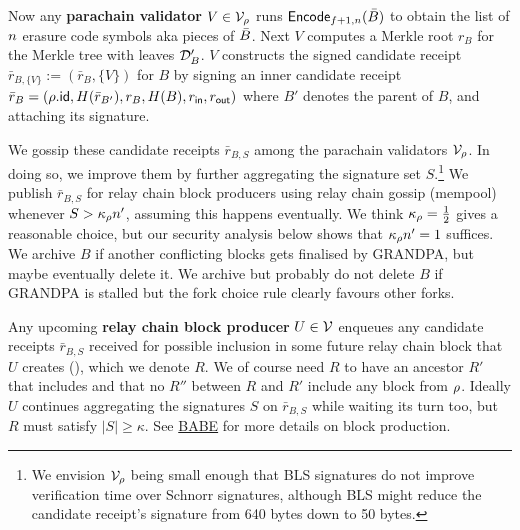 Now any {\bf parachain validator} $V \in \mathcal{V}_{\rho}$ runs $\mathsf{Encode}_{f+1,n}(\bar{B})$ to obtain the list  of $n$ erasure code symbols aka pieces of $\bar{B}$.  Next $V$ computes a Merkle root $r_B$ for the Merkle tree with leaves $\mathcal{D}'_B$.  $V$ constructs the signed candidate receipt $\bar{r}_{B,\{V\}} := (\bar{r}_{B},\{V\})$ for $B$ by signing an inner candidate receipt $\bar{r}_B = (\rho.\mathsf{id},H(\bar{r}_{B'}),r_B,H(B),r_{\mathsf{in}},r_{\mathsf{out}})$ where $B'$ denotes the parent of $B$, and attaching its signature.  

We gossip these candidate receipts $\bar{r}_{B,S}$ among the parachain validators $\mathcal{V}_{\rho}$.  In doing so, we improve them by further aggregating the signature set $S$.\footnote{We envision $\mathcal{V}_{\rho}$ being small enough that BLS signatures do not improve verification time over Schnorr signatures, although BLS might reduce the candidate receipt's signature from 640 bytes down to 50 bytes.}  We publish $\bar{r}_{B,S}$ for relay chain block producers using relay chain gossip (mempool) whenever $S > \kappa_{\rho} n'$, assuming this happens eventually.  We think $\kappa_{\rho} = {1\over2}$ gives a reasonable choice, but our security analysis below shows that $\kappa_{\rho} n' = 1$ suffices.  We archive $B$ if another conflicting blocks gets finalised by GRANDPA, but maybe eventually delete it.  We archive but probably do not delete $B$ if GRANDPA is stalled but the fork choice rule clearly favours other forks.  

\smallskip

Any upcoming {\bf relay chain block producer} $U \in \mathcal{V}$ enqueues any candidate receipts $\bar{r}_{B,S}$ received for possible inclusion in some future relay chain block that $U$ creates (), which we denote $R$.  We of course need $R$ to have an ancestor $R'$ that includes  and that no $R''$ between $R$ and $R'$ include any block from $\rho$.  Ideally $U$ continues aggregating the signatures $S$ on $\bar{r}_{B,S}$ while waiting its turn too, but $R$ must satisfy $|S| \ge \kappa$.  See \href{http://research.web3.foundation/en/latest/polkadot/BABE/Babe/}{BABE} for more details on block production.


